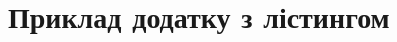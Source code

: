 ﻿%
\chapter[(Довідковий) Приклад додатку з лістингом]{Приклад додатку з лістингом}

\inputminted{c++}{src/main.cpp}